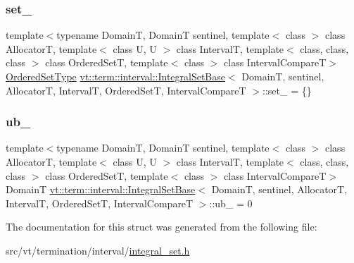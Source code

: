 \mbox{\label{structvt_1_1term_1_1interval_1_1_integral_set_base_a5ed151f2f412d1df26f6b1fae4515bad}} 
\subsubsection{\texorpdfstring{set\+\_\+}{set\_}}
{\footnotesize\ttfamily template$<$typename DomainT, DomainT sentinel, template$<$ class $>$ class AllocatorT, template$<$ class U, U $>$ class IntervalT, template$<$ class, class, class $>$ class Ordered\+SetT, template$<$ class $>$ class Interval\+CompareT$>$ \\
\hyperlink{structvt_1_1term_1_1interval_1_1_integral_set_base_af29bc3750493c7de4043f43ef7eb2ca2}{Ordered\+Set\+Type} \hyperlink{structvt_1_1term_1_1interval_1_1_integral_set_base}{vt\+::term\+::interval\+::\+Integral\+Set\+Base}$<$ DomainT, sentinel, AllocatorT, IntervalT, Ordered\+SetT, Interval\+CompareT $>$\+::set\+\_\+ = \{\}\hspace{0.3cm}{\ttfamily [private]}}

\mbox{\label{structvt_1_1term_1_1interval_1_1_integral_set_base_ace5d01da6b573a7e13405b362ca57f48}} 
\subsubsection{\texorpdfstring{ub\+\_\+}{ub\_}}
{\footnotesize\ttfamily template$<$typename DomainT, DomainT sentinel, template$<$ class $>$ class AllocatorT, template$<$ class U, U $>$ class IntervalT, template$<$ class, class, class $>$ class Ordered\+SetT, template$<$ class $>$ class Interval\+CompareT$>$ \\
DomainT \hyperlink{structvt_1_1term_1_1interval_1_1_integral_set_base}{vt\+::term\+::interval\+::\+Integral\+Set\+Base}$<$ DomainT, sentinel, AllocatorT, IntervalT, Ordered\+SetT, Interval\+CompareT $>$\+::ub\+\_\+ = 0\hspace{0.3cm}{\ttfamily [private]}}



The documentation for this struct was generated from the following file\+:\begin{DoxyCompactItemize}
\item 
src/vt/termination/interval/\hyperlink{integral__set_8h}{integral\+\_\+set.\+h}\end{DoxyCompactItemize}
